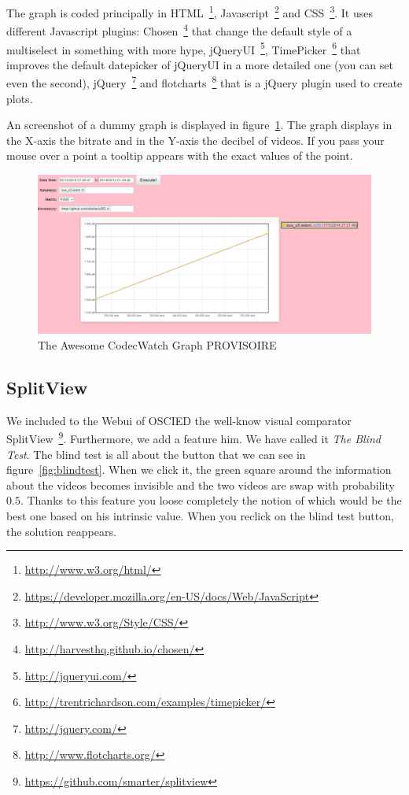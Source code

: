 \documentclass[a4paper,12pt]{article}
\begin{document}
The graph is coded principally in HTML~\footnote{\url{http://www.w3.org/html/}}, Javascript~\footnote{\url{https://developer.mozilla.org/en-US/docs/Web/JavaScript}} and CSS~\footnote{\url{http://www.w3.org/Style/CSS/}}. It uses different Javascript plugins: Chosen~\footnote{\url{http://harvesthq.github.io/chosen/}} that change the default style of a multiselect in something with more hype, jQueryUI~\footnote{\url{http://jqueryui.com/}}, TimePicker~\footnote{\url{http://trentrichardson.com/examples/timepicker/}} that improves the default datepicker of jQueryUI in a more detailed one (you can set even the second), jQuery~\footnote{\url{http://jquery.com/}} and flotcharts~\footnote{\url{http://www.flotcharts.org/}} that is a jQuery plugin used to create plots.

An screenshot of a dummy graph is displayed in figure~\ref{fig:graph1}. The graph displays in the X-axis the bitrate and in the Y-axis the decibel of videos. If you pass your mouse over a point a tooltip appears with the exact values of the point.

\begin{figure}[!h]
	\centering
	\includegraphics[width=1\textwidth]{figures/graph1.png}
	\caption{The Awesome CodecWatch Graph PROVISOIRE}
	\label{fig:graph1}
\end{figure}

\subsection{SplitView}
We included to the Webui of OSCIED the well-know visual comparator SplitView~\footnote{\url{https://github.com/smarter/splitview}}. Furthermore, we add a feature him. We have called it \emph{The Blind Test}. The blind test is all about the button that we can see in figure~\ref{fig:blindtest}. When we click it, the green square around the information about the videos becomes invisible and the two videos are swap with probability $0.5$. Thanks to this feature you loose completely the notion of which would be the best one based on his intrinsic value. When you reclick on the blind test button, the solution reappears.
\end{document}
